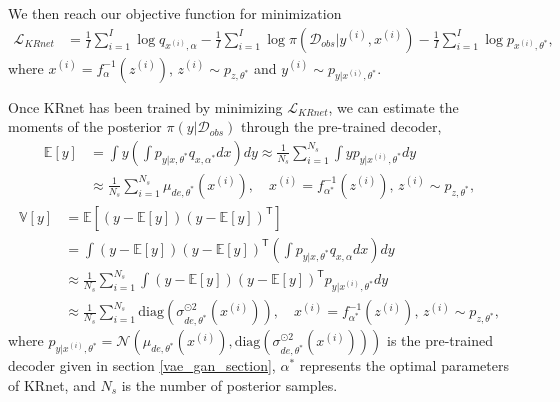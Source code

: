 We then reach our objective function for minimization
\begin{align}
	\mathcal{L}_{KRnet}&=\frac{1}{I}\sum_{i=1}^I\log q_{x^{(i)},\alpha}-\frac{1}{I}\sum_{i=1}^I \log \pi\left(\mathcal{D}_{obs}|y^{(i)},x^{(i)}\right)-\frac{1}{I}\sum_{i=1}^I\log p_{x^{(i)},\theta^*}, \label{krnet_loss}
\end{align}
where $x^{(i)}=f_{\alpha}^{-1}\left(z^{(i)}\right),\, z^{(i)} \sim p_{z,\theta^*}$ and $y^{(i)}\sim p_{y|x^{(i)},\theta^*} $.

Once KRnet has been trained by minimizing $\mathcal{L}_{KRnet}$, we can estimate the moments of the posterior  $\pi(y|\mathcal{D}_{obs})$ through the pre-trained decoder,
\begin{align}
	\mathbb{E}[y]&=\int y \left(\int p_{y|x,\theta^*}q_{x,\alpha^*}dx \right) dy
	\approx \frac{1}{N_s}\sum_{i=1}^{N_s}\int y p_{y|x^{(i)},\theta^*} dy\nonumber\\
	&\approx \frac{1}{N_s}\sum_{i=1}^{N_s} \mu_{de,\theta^*}\left(x^{(i)}\right),\quad x^{(i)}=f_{\alpha^*}^{-1}\left(z^{(i)}\right),\, z^{(i)} \sim p_{z,\theta^*}, \label{mean_compute}
\end{align}
\begin{align}
	\mathbb{V}[y]&=\mathbb{E}\left[\left(y-\mathbb{E}[y]\right)\left(y-\mathbb{E}[y]\right)^\mathsf{T}\right]\nonumber\\
	&=\int (y-\mathbb{E}[y])(y-\mathbb{E}[y])^\mathsf{T}\left(\int p_{y|x,\theta^*}q_{x,\alpha}dx \right) dy\nonumber\\
	&\approx \frac{1}{N_s}\sum_{i=1}^{N_s}\int (y-\mathbb{E}[y])(y-\mathbb{E}[y])^\mathsf{T} p_{y|x^{(i)},\theta^*} dy\nonumber\\
	&\approx \frac{1}{N_s}\sum_{i=1}^{N_s} \text{diag}\left(\sigma_{de,\theta^*}^{\odot 2}\left(x^{(i)}\right)\right),\quad x^{(i)}=f_{\alpha^*}^{-1}\left(z^{(i)}\right),\, z^{(i)} \sim p_{z,\theta^*},\label{variance_compute}
\end{align}
where $ p_{y|x^{(i)},\theta^*}=\mathcal{N}\left(\mu_{de,\theta^*}\left(x^{(i)}\right), \text{diag}\left(\sigma_{de,\theta^*}^{\odot 2}\left(x^{(i)}\right)\right)\right)$ is the pre-trained decoder given in section \ref{vae_gan_section}, $\alpha^*$ represents the optimal parameters of KRnet, and $N_s$ is the number of posterior samples.
